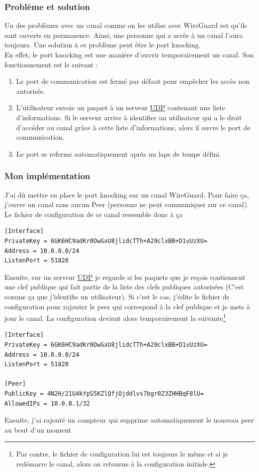 \documentclass[a4paper, 12pt]{article}
\begin{document}
\subsubsection{Problème et solution}

Un des problèmes avec un canal comme on les utilise avec WireGuard est qu'ils sont ouverts en permanence. Ainsi, une personne qui a accès à un canal l'aura toujours. Une solution à ce problème peut être le port knocking. \\
En effet, le port knocking est une manière d'ouvrir temporairement un canal. Son fonctionnement est le suivant :

\begin{enumerate}
\item Le port de communication est fermé par défaut pour empêcher les accès non autorisés.
\item L'utilisateur envoie un paquet à un serveur \hyperref[UDP]{UDP} contenant une liste d'informations. Si le serveur arrive à identifier un utilisateur qui a le droit d'accéder au canal grâce à cette liste d'informations, alors il ouvre le port de communication.
\item Le port se referme automatiquement après un laps de temps défini.
\end{enumerate}
\subsubsection{Mon implémentation}
J'ai dû mettre en place le port knocking sur un canal WireGuard. Pour faire ça, j'ouvre un canal sans aucun Peer (personne ne peut communiquer sur ce canal). Le fichier de configuration de ce canal ressemble donc à ça 
\begin{lstlisting}[language = shell]
[Interface]
PrivateKey = 6GK6HC9adKr0OwGxU8jlidcTTh+A29clxBB+D1vUzXU= 
Address = 10.0.0.0/24
ListenPort = 51820
\end{lstlisting}
Ensuite, sur un serveur \hyperref[UDP]{UDP} je regarde si les paquets que je reçois contiennent une clef publique qui fait partie de la liste des clefs publiques autorisées (C'est comme ça que j'identifie un utilisateur). Si c'est le cas, j'édite le fichier de configuration pour rajouter le peer qui correspond à la clef publique et je mets à jour le canal. La configuration devient alors temporairement la suivante\footnote{Par contre, le fichier de configuration lui est toujours le même et si je redémarre le canal, alors on retourne à la configuration initiale.}
\begin{lstlisting}[language = shell]
[Interface]
PrivateKey = 6GK6HC9adKr0OwGxU8jlidcTTh+A29clxBB+D1vUzXU= 
Address = 10.0.0.0/24
ListenPort = 51820

[Peer]
PublicKey = 4N2H/21U4kYpS5KZlQfjOjddlvs7bgr0Z3ZHHBqF8lU=
AllowedIPs = 10.0.0.1/32
\end{lstlisting}
Ensuite, j'ai rajouté un compteur qui supprime automatiquement le nouveau peer au bout d'un moment. \\
\end{document}
